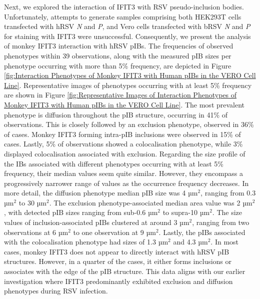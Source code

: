 Next, we explored the interaction of IFIT3 with RSV pseudo-inclusion bodies. Unfortunately, attempts to generate samples comprising both HEK293T cells transfected with hRSV \textit{N} and \textit{P}, and Vero cells transfected with bRSV \textit{N} and \textit{P} for staining with IFIT3 were unsuccessful. Consequently, we present the analysis of monkey IFIT3 interaction with hRSV pIBs. The frequencies of observed phenotypes within 39 observations, along with the measured pIB sizes per phenotype occurring with more than 5\% frequency, are depicted in Figure \ref{fig:Interaction Phenotypes of Monkey IFIT3 with Human pIBs in the VERO Cell Line}. Representative images of phenotypes occurring with at least 5\% frequency are shown in Figure \ref{fig:Representative Images of Interaction Phenotypes of Monkey IFIT3 with Human pIBs in the VERO Cell Line}. The most prevalent phenotype is diffusion throughout the pIB structure, occurring in 41\% of observations. This is closely followed by an exclusion phenotype, observed in 36\% of cases. Monkey IFIT3 forming intra-pIB inclusions were observed in 15\% of cases. Lastly, 5\% of observations showed a colocalisation phenotype, while 3\% displayed colocalisation associated with exclusion. Regarding the size profile of the IBs associated with different phenotypes occurring with at least 5\% frequency, their median values seem quite similar. However, they encompass a progressively narrower range of values as the occurrence frequency decreases. In more detail, the diffusion phenotype median pIB size was 4 \(\mbox{µm}^2\), ranging from 0.3 \(\mbox{µm}^2\) to 30 \(\mbox{µm}^2\). The exclusion phenotype-associated median area value was 2 \(\mbox{µm}^2\), with detected pIB sizes ranging from sub-0.6 \(\mbox{µm}^2\) to supra-10 \(\mbox{µm}^2\). The size values of inclusion-associated pIBs clustered at around 3 \(\mbox{µm}^2\), ranging from two observations at 6 \(\mbox{µm}^2\) to one observation at 9 \(\mbox{µm}^2\). Lastly, the pIBs associated with the colocalisation phenotype had sizes of 1.3 \(\mbox{µm}^2\) and 4.3 \(\mbox{µm}^2\). In most cases, monkey IFIT3 does not appear to directly interact with hRSV pIB structures. However, in a quarter of the cases, it either forms inclusions or associates with the edge of the pIB structure. This data aligns with our earlier investigation where IFIT3 predominantly exhibited exclusion and diffusion phenotypes during RSV infection.

